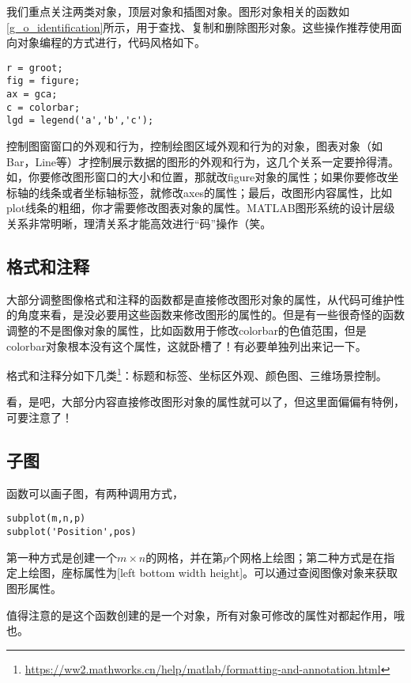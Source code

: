 我们重点关注两类对象，顶层对象和插图对象。图形对象相关的函数如\autoref{g_o_identification}所示，用于查找、复制和删除图形对象。这些操作推荐使用面向对象编程的方式进行，代码风格如下。

\begin{verbatim}
r = groot;
fig = figure;
ax = gca;
c = colorbar;
lgd = legend('a','b','c');
\end{verbatim}

控制图窗窗口的外观和行为，控制绘图区域外观和行为的对象，图表对象（如Bar，Line等）才控制展示数据的图形的外观和行为，这几个关系一定要拎得清。如，你要修改图形窗口的大小和位置，那就改figure对象的属性；如果你要修改坐标轴的线条或者坐标轴标签，就修改axes的属性；最后，改图形内容属性，比如plot线条的粗细，你才需要修改图表对象的属性。MATLAB图形系统的设计层级关系非常明晰，理清关系才能高效进行“码”操作（笑。

\subsection{格式和注释}

大部分调整图像格式和注释的函数都是直接修改图形对象的属性，从代码可维护性的角度来看，是没必要用这些函数来修改图形的属性的。但是有一些很奇怪的函数调整的不是图像对象的属性，比如函数用于修改colorbar的色值范围，但是colorbar对象根本没有这个属性，这就卧槽了！有必要单独列出来记一下。

格式和注释分如下几类\footnote{\url{https://ww2.mathworks.cn/help/matlab/formatting-and-annotation.html}}：标题和标签、坐标区外观、颜色图、三维场景控制。

看，是吧，大部分内容直接修改图形对象的属性就可以了，但这里面偏偏有特例，可要注意了！

\subsection{子图}

函数可以画子图，有两种调用方式，

\begin{verbatim}
subplot(m,n,p)
subplot('Position',pos)
\end{verbatim}

第一种方式是创建一个$ m\times n $的网格，并在第$ p $个网格上绘图；第二种方式是在指定上绘图，座标属性为[left bottom width height]。可以通过查阅图像对象来获取图形属性。

值得注意的是这个函数创建的是一个对象，所有对象可修改的属性对都起作用，哦也。

